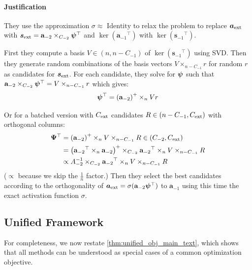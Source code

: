 \paragraph{Justification}

They use the approximation \(\sigma \approx \text{ Identity}\) to relax
the problem to replace \(\boldsymbol{a_{\text{ext}}}\) with
\(\boldsymbol{s_{\text{ext}}} = \mathbf{a}_{- 2} \times_{C_{- 2}}\boldsymbol{\psi}{}^{\top}\) and
\(\ker({\mathbf{a}_{- 1}}^{\top})\) with
\(\ker({\mathbf{s}_{- 1}}^{\top})\).

First they compute a basis \(V \in \left( n,n - C_{- 1} \right)\) of
\(\ker({\mathbf{s}_{- 1}}^{\top})\) using SVD. Then they generate random
combinations of the basis vectors \(V \times_{n - C_{- 1}}r\) for random
\(r\) as candidates for \(\boldsymbol{s_{\text{ext}}}\). For each candidate, they solve
for \(\boldsymbol{\psi}{}\) such that
\(\mathbf{a}_{- 2} \times_{C_{- 2}}\boldsymbol{\psi}{}^{\top} = V \times_{n - C_{- 1}}r\)
which gives:
\[\boldsymbol{\psi}{}^{\top} = \left( \mathbf{a}_{- 2} \right)^{+} \times_{n}Vr\]

Or for a batched version with \(C_{\text{ext}}\) candidates
\(R \in \left( n - C_{- 1},C_{\text{ext}} \right)\) with orthogonal columns:
\[\begin{aligned}
\boldsymbol{\Psi}{}^{\top} & = \left( \mathbf{a}_{- 2} \right)^{+} \times_{n}V \times_{n - C_{- 1}}R \in \left( C_{- 2},C_{\text{ext}} \right) \\
 & = \left( {\mathbf{a}_{- 2}}^{\top} \times_{n}\mathbf{a}_{- 2} \right)^{+} \times_{C_{- 2}}{\mathbf{a}_{- 2}}^{\top} \times_{n}V \times_{n - C_{- 1}}R \\
 & \propto A_{- 2}^{- 1} \times_{C_{- 2}}{\mathbf{a}_{- 2}}^{\top} \times_{n}V \times_{n - C_{- 1}}R
\end{aligned}\] (\(\propto\) because we skip the \(\frac{1}{n}\)
factor.) Then they select the best candidates according to the
orthogonality of
\(\boldsymbol{a_{\text{ext}}} = \sigma(\mathbf{a}_{- 2}\boldsymbol{\psi}{}^{\top})\) to
\(\mathbf{a}_{- 1}\) using this time the exact activation function
\(\sigma\).

\subsection{Unified Framework}

For completeness, we now restate \autoref{thm:unified_obj_main_text}, which shows that all methods can be understood as special cases of a
common optimization objective.

